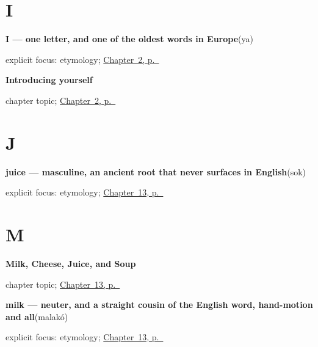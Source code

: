 \section*{I}

\noindent\begin{minipage}[t]{\linewidth}
\raggedright
\textbf{I — one letter, and one of the oldest words in Europe}\enspace\emph{}\enspace(ya)\par
\footnotesize explicit focus: etymology; \hyperref[ch:russian-introductions]{Chapter~2, p.~\pageref*{ch:russian-introductions}}
\end{minipage}\par\smallskip

\noindent\begin{minipage}[t]{\linewidth}
\raggedright
\textbf{Introducing yourself}\par
\footnotesize chapter topic; \hyperref[ch:russian-introductions]{Chapter~2, p.~\pageref*{ch:russian-introductions}}
\end{minipage}\par\smallskip

\section*{J}

\noindent\begin{minipage}[t]{\linewidth}
\raggedright
\textbf{juice — masculine, an ancient root that never surfaces in English}\enspace\emph{}\enspace(sok)\par
\footnotesize explicit focus: etymology; \hyperref[ch:russian-milk-cheese-juice-soup]{Chapter~13, p.~\pageref*{ch:russian-milk-cheese-juice-soup}}
\end{minipage}\par\smallskip

\section*{M}

\noindent\begin{minipage}[t]{\linewidth}
\raggedright
\textbf{Milk, Cheese, Juice, and Soup}\par
\footnotesize chapter topic; \hyperref[ch:russian-milk-cheese-juice-soup]{Chapter~13, p.~\pageref*{ch:russian-milk-cheese-juice-soup}}
\end{minipage}\par\smallskip

\noindent\begin{minipage}[t]{\linewidth}
\raggedright
\textbf{milk — neuter, and a straight cousin of the English word, hand-motion and all}\enspace\emph{}\enspace(malakó)\par
\footnotesize explicit focus: etymology; \hyperref[ch:russian-milk-cheese-juice-soup]{Chapter~13, p.~\pageref*{ch:russian-milk-cheese-juice-soup}}
\end{minipage}\par\smallskip

